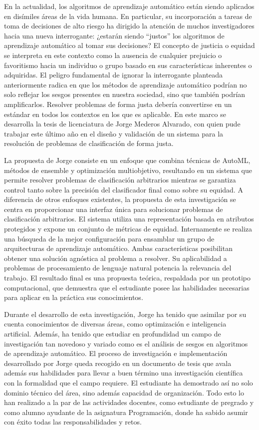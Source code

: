 \begin{opinion}

En la actualidad, los algoritmos de aprendizaje automático están siendo aplicados en disímiles áreas de la vida humana. En particular, su incorporación a tareas de toma de decisiones de alto riesgo ha dirigido la atención de muchos investigadores hacia una nueva interrogante: ¿estarán siendo “justos” los algoritmos de aprendizaje automático al tomar sus decisiones? El concepto de justicia o equidad se interpreta en este contexto como la ausencia de cualquier prejuicio o favoritismo hacia un individuo o grupo basado en sus características inherentes o adquiridas. El peligro fundamental de ignorar la interrogante planteada anteriormente radica en que los métodos de aprendizaje automático podrían no solo reflejar los sesgos presentes en nuestra sociedad, sino que también podrían amplificarlos. Resolver problemas de forma justa debería convertirse en un estándar en todos los contextos en los que es aplicable. En este marco se desarrolla la tesis de licenciatura de Jorge Mederos Alvarado, con quien pude trabajar este último año en el diseño y validación de un sistema para la resolución de problemas de clasificación de forma justa.

La propuesta de Jorge consiste en un enfoque que combina técnicas de AutoML, métodos de ensemble y optimización multiobjetivo, resultando en un sistema que permite resolver problemas de clasificación arbitrarios mientras se garantiza control tanto sobre la precisión del clasificador final como sobre su equidad. A diferencia de otros enfoques existentes, la propuesta de esta investigación se centra en proporcionar una interfaz única para solucionar problemas de clasificación arbitrarios. El sistema utiliza una representación basada en atributos protegidos y expone un conjunto de métricas de equidad. Internamente se realiza una búsqueda de la mejor configuración para ensamblar un grupo de arquitecturas de aprendizaje automático. Ambas características posibilitan obtener una solución agnóstica al problema a resolver. Su aplicabilidad a problemas de procesamiento de lenguaje natural potencia la relevancia del trabajo. El resultado final es una propuesta teórica, respaldada por un prototipo computacional, que demuestra que el estudiante posee las habilidades necesarias para aplicar en la práctica sus conocimientos.

Durante el desarrollo de esta investigación, Jorge ha tenido que asimilar por su cuenta conocimientos de diversas áreas, como optimización e inteligencia artificial. Además, ha tenido que estudiar en profundidad un campo de investigación tan novedoso y variado como es el análisis de sesgos en algoritmos de aprendizaje automático. El proceso de investigación e implementación desarrollado por Jorge queda recogido en un documento de tesis que avala además sus habilidades para llevar a buen término una investigación científica con la formalidad que el campo requiere. El estudiante ha demostrado así no solo dominio técnico del área, sino además capacidad de organización.  Todo esto lo han realizado a la par de las actividades docentes, como estudiante de pregrado y como alumno ayudante de la asignatura Programación, donde ha sabido asumir con éxito todas las responsabilidades y retos.


\end{opinion}
